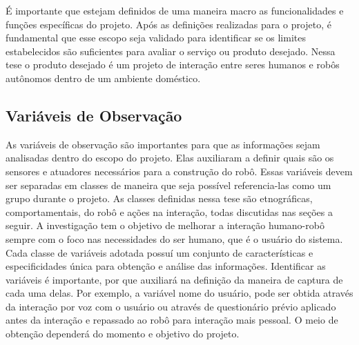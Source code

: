É importante que estejam definidos de uma maneira macro as funcionalidades e funções específicas do projeto. Após as definições realizadas para o projeto, é fundamental que esse escopo seja validado para identificar se os limites estabelecidos são suficientes para avaliar o serviço ou produto desejado. Nessa tese o produto desejado é um projeto de interação entre seres humanos e robôs autônomos dentro de um ambiente doméstico.

\subsection{Variáveis de Observação}
\label{sec:variaveis}
As variáveis de observação são importantes para que as informações sejam analisadas dentro do escopo do projeto. Elas auxiliaram a definir quais são os sensores e atuadores necessários para a construção do robô. Essas variáveis devem ser separadas em classes de maneira que seja possível referencia-las como um grupo durante o projeto. As classes definidas nessa tese são etnográficas, comportamentais, do robô e ações na interação, todas discutidas nas seções a seguir. A investigação tem o objetivo de melhorar a interação humano-robô sempre com o foco nas necessidades do ser humano, que é o usuário do sistema. Cada classe de variáveis adotada possuí um conjunto de características e especificidades única para obtenção e análise das informações. Identificar as variáveis é importante, por que auxiliará na definição da maneira de captura de cada uma delas. Por exemplo, a variável nome do usuário, pode ser obtida através da interação por voz com o usuário ou através de questionário prévio aplicado antes da interação e repassado ao robô para interação mais pessoal. O meio de obtenção dependerá do momento e objetivo do projeto.

